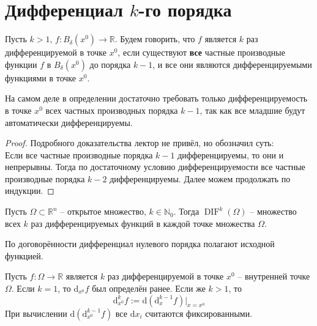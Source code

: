 \documentclass[11pt]{article}
\DeclareMathOperator{\DIF}{DIF}
\begin{document}
\section{Дифференциал $k$-го порядка}

\begin{definition}
    Пусть $k > 1$, $f \colon B_{\delta}(x^0) \to \mathbb{R}$. Будем говорить, 
    что $f$ является $k$ раз дифференцируемой в точке $x^0$, если существуют 
    \textbf{все} частные производные функции $f$ в $B_{\delta}(x^0)$ до порядка $k - 1$, и все они 
    являются дифференцируемыми функциями в точке $x^0$.
\end{definition}

\begin{remark}
    На самом деле в определении достаточно требовать только дифференцируемость 
    в точке $x^0$ всех частных производных порядка $k - 1$, так как 
    все младшие будут автоматически дифференцируемы.
\end{remark}

\begin{proof}
    Подробного доказательства лектор не привёл, но обозначил суть: \\
    Если все частные производные порядка $k - 1$ дифференцируемы, то они 
    и непрерывны. Тогда по достаточному условию дифференцируемости 
    все частные производные порядка $k - 2$ дифференцируемы. Далее можем 
    продолжать по индукции.
\end{proof}

\begin{definition}
    Пусть $\Omega \subset \mathbb{R}^n$ -- открытое множество, $k \in 
    \mathbb{N}_0$. Тогда $\DIF^k(\Omega)$ -- множество всех $k$ раз дифференцируемых 
    функций в каждой точке множества $\Omega$.
\end{definition}

\begin{remark}
    По договорённости дифференциал нулевого порядка полагают исходной функцией.
\end{remark}

\begin{definition}
    Пусть $f \colon \Omega \to \mathbb{R}$ является $k$ раз дифференцируемой в точке $x^0$ -- внутренней 
    точке $\Omega$. Если $k = 1$, то 
    $\mathrm{d}_{x^0}f$ был определён ранее. Если же $k > 1$, то 
    \[\mathrm{d}^k_{x^0}f := \mathrm{d}(\mathrm{d}^{k - 1}_{x}f) \Bigr|_{x = x^0}\]
    При вычислении $\mathrm{d}(\mathrm{d}^{k - 1}_{x^0}f)$ все 
    $\mathrm{d}x_i$ считаются фиксированными.
\end{definition}
\end{document}
